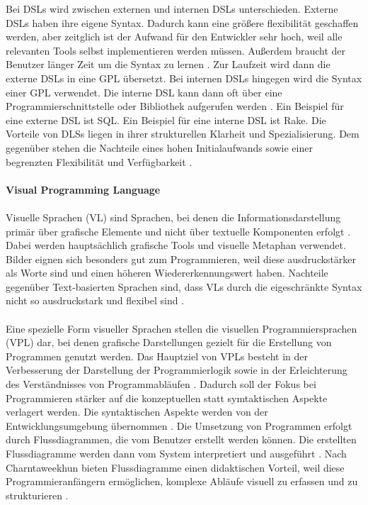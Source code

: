 \documentclass{article}
\begin{document}
    Bei DSLs wird zwischen externen und internen DSLs unterschieden. Externe DSLs haben ihre eigene Syntax. 
    Dadurch kann eine größere flexibilität geschaffen werden, aber zeitglich ist der Aufwand für den Entwickler sehr hoch, weil alle relevanten Tools selbst implementieren werden müssen. 
    Außerdem braucht der Benutzer länger Zeit um die Syntax zu lernen \cite{7}.
    Zur Laufzeit wird dann die externe DSLs in eine GPL übersetzt.
    Bei internen DSLs hingegen wird die Syntax einer GPL verwendet. 
    Die interne DSL kann dann oft über eine Programmierschnittstelle oder Bibliothek aufgerufen werden \cite{14}.
    Ein Beispiel für eine externe DSL ist SQL.
    Ein Beispiel für eine interne DSL ist Rake.
    Die Vorteile von DLSs liegen in ihrer strukturellen Klarheit und Spezialisierung. Dem gegenüber stehen die Nachteile eines hohen Initialaufwands sowie einer begrenzten Flexibilität und Verfügbarkeit \cite{18}.\\ 
    \\
    \textbf{Visual Programming Language}\\
    \\
    Visuelle Sprachen (VL) sind Sprachen, bei denen die Informationsdarstellung primär über grafische Elemente und nicht über textuelle Komponenten erfolgt \cite{5}.
    Dabei werden hauptsächlich grafische Tools und visuelle Metaphan verwendet. 
    Bilder eignen sich besonders gut zum Programmieren, weil diese ausdruckstärker als Worte sind und einen höheren Wiedererkennungswert haben.
    Nachteile gegenüber Text-basierten Sprachen sind, dass VLs durch die eigeschränkte Syntax nicht so ausdruckstark und flexibel sind \cite{16}.\\
    \\
    Eine spezielle Form visueller Sprachen stellen die visuellen Programmiersprachen (VPL) dar, bei denen grafische Darstellungen gezielt für die Erstellung von Programmen genutzt werden.    
    Das Hauptziel von VPLs besteht in der Verbesserung der Darstellung der Programmierlogik sowie in der Erleichterung des Verständnisses von Programmabläufen \cite{13}.
    Dadurch soll der Fokus bei Programmieren stärker auf die konzeptuellen statt symtaktischen Aspekte verlagert werden. 
    Die syntaktischen Aspekte werden von der Entwicklungsumgebung übernommen \cite{10}.
    Die Umsetzung von Programmen erfolgt durch Flussdiagrammen, die vom Benutzer erstellt werden können. 
    Die erstellten Flussdiagramme werden dann vom System interpretiert und ausgeführt \cite{12}.
    Nach Charntaweekhun bieten Flussdiagramme einen didaktischen Vorteil, weil diese Programmieranfängern ermöglichen, komplexe Abläufe visuell zu erfassen und zu strukturieren \cite{12}.
\end{document}
